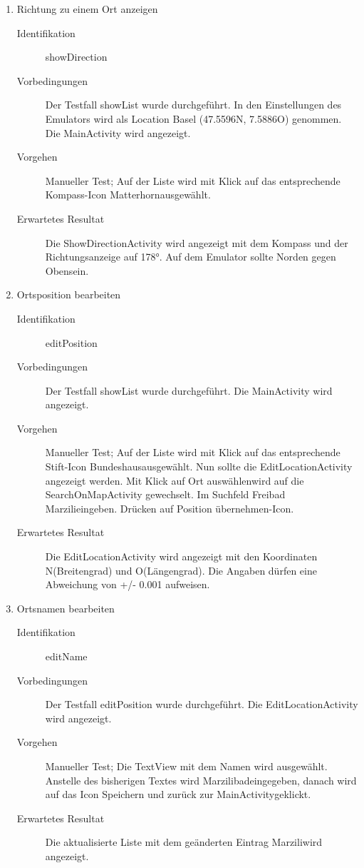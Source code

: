 \documentclass[12pt,a4paper]{scrartcl}
\begin{document}
\begin{enumerate}
  \item Richtung zu einem Ort anzeigen

  \begin{description}
    \item [Identifikation] showDirection
    \item [Vorbedingungen] Der Testfall showList wurde durchgeführt. In den Einstellungen des Emulators wird als Location Basel (47.5596N, 7.5886O) genommen. Die MainActivity wird angezeigt.
    \item [Vorgehen] Manueller Test; Auf der Liste wird mit Klick auf das entsprechende Kompass-Icon \dq Matterhorn\dq  ausgewählt.
    \item [Erwartetes Resultat] Die ShowDirectionActivity wird angezeigt mit dem Kompass und der Richtungsanzeige auf 178°. Auf dem Emulator sollte Norden gegen \dq Oben\dq  sein.
  \end{description}

  \item Ortsposition bearbeiten

  \begin{description}
    \item [Identifikation] editPosition
    \item [Vorbedingungen] Der Testfall showList wurde durchgeführt. Die MainActivity wird angezeigt.
    \item [Vorgehen] Manueller Test; Auf der Liste wird mit Klick auf das entsprechende Stift-Icon \dq Bundeshaus\dq  ausgewählt. Nun sollte die EditLocationActivity angezeigt werden. Mit Klick auf \dq Ort auswählen\dq  wird auf die SearchOnMapActivity gewechselt. Im Suchfeld \dq Freibad Marzili\dq  eingeben. Drücken auf \dq Position übernehmen\dq -Icon.
    \item [Erwartetes Resultat] Die EditLocationActivity wird angezeigt mit den Koordinaten  N\dq  (Breitengrad) und  O\dq  (Längengrad). Die Angaben dürfen eine Abweichung von +/- 0.001 aufweisen.
  \end{description}

  \item Ortsnamen bearbeiten

  \begin{description}
  \item [Identifikation] editName
  \item [Vorbedingungen] Der Testfall editPosition wurde durchgeführt. Die EditLocationActivity wird angezeigt.
  \item [Vorgehen] Manueller Test; Die TextView mit dem Namen wird ausgewählt. Anstelle des bisherigen Textes wird \dq Marzilibad\dq  eingegeben, danach wird auf das Icon \dq Speichern und zurück zur MainActivity\dq  geklickt.
  \item [Erwartetes Resultat] Die aktualisierte Liste mit dem geänderten Eintrag \dq Marzili\dq  wird angezeigt.
  \end{description}

\end{enumerate}
\end{document}
